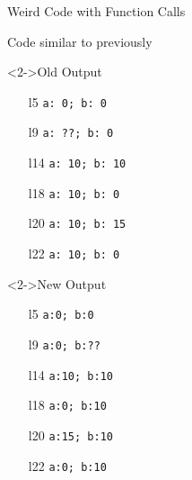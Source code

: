 \begin{Coupe}
\begin{frame}{Weird Code with Function Calls}
\begin{minipage}{.56\linewidth}
\begin{block}{Code similar to previously}
    \end{block}
    \begin{block}<2->{Old Output}\medskip
      \begin{minipage}{.5\linewidth}
        \begin{itemize}
          \item[l5] \texttt{a:~0; b:~0}
          \item[l9] \texttt{a:~??;~b:~0}
          \item[l14] \texttt{a:~10;~b:~10}
        \end{itemize}      
      \end{minipage}\begin{minipage}{.5\linewidth}
        \begin{itemize}
          \item[l18] \texttt{a:~10;~b:~0}
          \item[l20] \texttt{a:~10;~b:~15}
          \item[l22] \texttt{a:~10;~b:~0}
        \end{itemize}
      \end{minipage}      
    \end{block}

    \begin{block}<2->{New Output}\medskip
      \begin{minipage}{.5\linewidth}
        \begin{itemize}
          \item[l5] \texttt{a:0; b:0}
          \item[l9] \texttt{a:0;~b:??}
          \item[l14] \texttt{a:10;~b:10}
        \end{itemize}      
      \end{minipage}\begin{minipage}{.5\linewidth}
        \begin{itemize}
          \item[l18] \texttt{a:0;~b:10}
          \item[l20] \texttt{a:15;~b:10}
          \item[l22] \texttt{a:0;~b:10}
        \end{itemize}
      \end{minipage}      
    \end{block}
    
    \medskip{}


\end{minipage}
\end{frame}
\end{Coupe}
